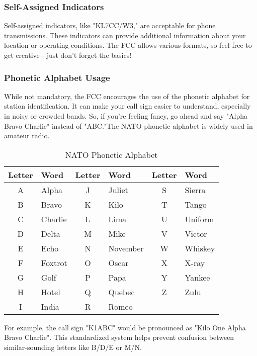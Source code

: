 \subsubsection*{Self-Assigned Indicators}
Self-assigned indicators, like "KL7CC/W3," are acceptable for phone transmissions. These indicators can provide additional information about your location or operating conditions. The FCC allows various formats, so feel free to get creative—just don't forget the basics!

\subsubsection*{Phonetic Alphabet Usage}
While not mandatory, the FCC encourages the use of the phonetic alphabet for station identification. It can make your call sign easier to understand, especially in noisy or crowded bands. So, if you're feeling fancy, go ahead and say "Alpha Bravo Charlie" instead of "ABC."The NATO phonetic alphabet is widely used in amateur radio.

\begin{table}[h]
    \centering
    \footnotesize
    \begin{tabular}{|c|l||c|l||c|l|}
        \hline
        \textbf{Letter} & \textbf{Word} & \textbf{Letter} & \textbf{Word} & \textbf{Letter} & \textbf{Word} \\
        \hline
        A & Alpha & J & Juliet & S & Sierra \\
        B & Bravo & K & Kilo & T & Tango \\
        C & Charlie & L & Lima & U & Uniform \\
        D & Delta & M & Mike & V & Victor \\
        E & Echo & N & November & W & Whiskey \\
        F & Foxtrot & O & Oscar & X & X-ray \\
        G & Golf & P & Papa & Y & Yankee \\
        H & Hotel & Q & Quebec & Z & Zulu \\
        I & India & R & Romeo & & \\
        \hline
    \end{tabular}
    \caption{NATO Phonetic Alphabet}
    \label{tab:phonetic-alphabet}
\end{table}

For example, the call sign "K1ABC" would be pronounced as "Kilo One Alpha Bravo Charlie". This standardized system helps prevent confusion between similar-sounding letters like B/D/E or M/N.



